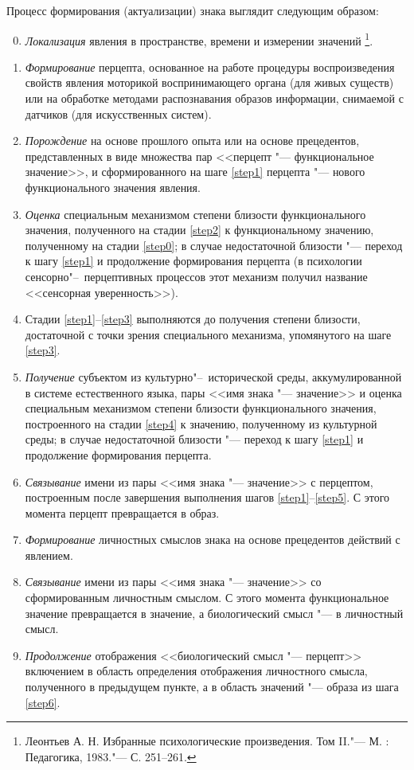 Процесс формирования (актуализации) знака выглядит следующим образом:
\begin{enumerate}
	\setcounter{enumi}{-1}
	\renewcommand\labelenumi{\theenumi.}
	\item\label{step0} \textit{Локализация} явления в пространстве, времени и измерении значений \footnote{Леонтьев А. Н. Избранные психологические произведения. Том II."--- М. : Педагогика,
		1983."--- С. 251--261.}.
	\item\label{step1} \textit{Формирование} перцепта, основанное на работе процедуры воспроизведения свойств явления моторикой воспринимающего органа (для живых существ) или на обработке методами распознавания образов информации, снимаемой с датчиков (для искусственных систем).
	\item\label{step2} \textit{Порождение} на основе прошлого опыта или на основе прецедентов, представленных в виде множества пар <<перцепт "--- функциональное значение>>, и сформированного на шаге \ref{step1} перцепта "--- нового функционального значения явления.
	\item\label{step3} \textit{Оценка} специальным механизмом степени близости функционального значения, полученного на стадии \ref{step2} к функциональному значению, полученному на стадии \ref{step0}; в случае недостаточной близости "--- переход к шагу \ref{step1} и продолжение формирования перцепта (в психологии сенсорно"--~перцептивных процессов этот механизм получил название <<сенсорная уверенность>>).
	\item\label{step4} Стадии \ref{step1}--\ref{step3} выполняются до получения степени близости, достаточной с точки зрения специального механизма, упомянутого на шаге \ref{step3}.
	\item\label{step5} \textit{Получение} субъектом из культурно"--~исторической среды, аккумулированной в системе естественного языка, пары <<имя знака "--- значение>> и оценка специальным механизмом степени близости функционального значения, построенного на стадии \ref{step4} к значению, полученному из культурной среды; в случае недостаточной близости "--- переход к шагу \ref{step1} и продолжение формирования перцепта.
	\item\label{step6} \textit{Связывание} имени из пары <<имя знака "--- значение>> с перцептом, построенным после завершения выполнения шагов \ref{step1}--\ref{step5}. С этого момента перцепт превращается в образ.
	\item \textit{Формирование} личностных смыслов знака на основе прецедентов действий с явлением.
	\item \textit{Связывание} имени из пары <<имя знака "--- значение>> со сформированным личностным смыслом. С этого момента функциональное значение превращается в значение, а биологический смысл "--- в личностный смысл.
	\item \textit{Продолжение} отображения <<биологический смысл "--- перцепт>> включением в область определения отображения личностного смысла, полученного в предыдущем пункте, а в область значений "--- образа из шага \ref{step6}.
\end{enumerate}

